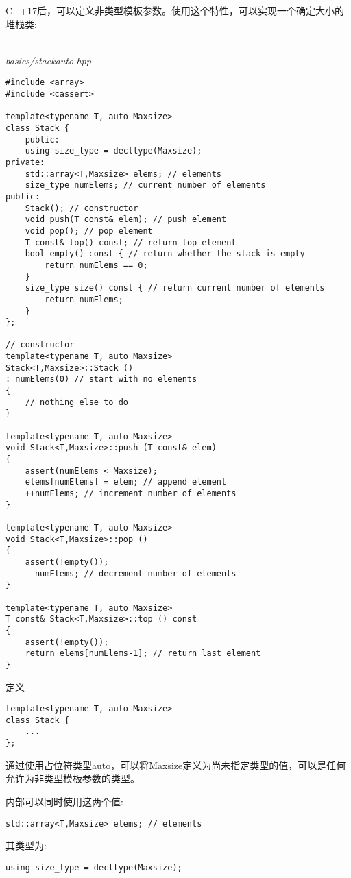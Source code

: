 C++17后，可以定义非类型模板参数。使用这个特性，可以实现一个确定大小的堆栈类:

\hspace*{\fill} \\ %
\noindent
\textit{basics/stackauto.hpp}
\begin{lstlisting}[style=styleCXX]
#include <array>
#include <cassert>

template<typename T, auto Maxsize>
class Stack {
	public:
	using size_type = decltype(Maxsize);
private:
	std::array<T,Maxsize> elems; // elements
	size_type numElems; // current number of elements
public:
	Stack(); // constructor
	void push(T const& elem); // push element
	void pop(); // pop element
	T const& top() const; // return top element
	bool empty() const { // return whether the stack is empty
		return numElems == 0;
	}
	size_type size() const { // return current number of elements
		return numElems;
	}
};

// constructor
template<typename T, auto Maxsize>
Stack<T,Maxsize>::Stack ()
: numElems(0) // start with no elements
{
	// nothing else to do
}

template<typename T, auto Maxsize>
void Stack<T,Maxsize>::push (T const& elem)
{
	assert(numElems < Maxsize);
	elems[numElems] = elem; // append element
	++numElems; // increment number of elements
}

template<typename T, auto Maxsize>
void Stack<T,Maxsize>::pop ()
{
	assert(!empty());
	--numElems; // decrement number of elements
}

template<typename T, auto Maxsize>
T const& Stack<T,Maxsize>::top () const
{
	assert(!empty());
	return elems[numElems-1]; // return last element
}
\end{lstlisting}

定义

\begin{lstlisting}[style=styleCXX]
template<typename T, auto Maxsize>
class Stack {
	...
};
\end{lstlisting}

通过使用占位符类型auto，可以将Maxsize定义为尚未指定类型的值，可以是任何允许为非类型模板参数的类型。

内部可以同时使用这两个值:

\begin{lstlisting}[style=styleCXX]
std::array<T,Maxsize> elems; // elements
\end{lstlisting}

其类型为:

\begin{lstlisting}[style=styleCXX]
using size_type = decltype(Maxsize);
\end{lstlisting}

